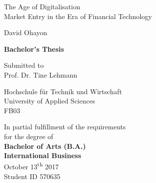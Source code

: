 \documentclass[11pt,a4paper]{article}
\begin{document}
  
   

\begin{titlepage}    
\begin{center} 

\vspace*{2cm}

{\Huge{The Age of Digitalisation}} \\
\vspace*{0.4cm} 
\LARGE{Market Entry in the Era of Financial Technology}

\vspace*{1.5cm} 

\Large{David Ohayon}\\


\vspace*{1.5cm}

\large{
\textbf{Bachelor's Thesis}\\
} 
      
\vspace*{1cm}

\large{Submitted to\\
Prof. Dr. Tine Lehmann\\}

\vspace*{1.0cm}
\large{Hochschule für Technik und Wirtschaft\\}
\large{University of Applied Sciences\\}
\large{FB03}
\vspace*{1.0cm}

\vspace*{2cm}
\small{In partial fulfillment of the requirements\\
for the degree of \\
\vspace{4mm}
\normalsize \textbf{Bachelor of Arts (B.A.) \\
International Business}\\
}
\vspace{1cm}
\large{October 13\textsuperscript{th} 2017}\\
\large{Student ID 570635}\\
      
\end{center}
\end{titlepage}
\end{document}
